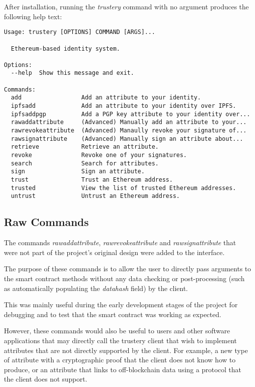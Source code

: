 \documentclass[12pt,a4paper]{report}
\begin{document}
	After installation, running the \textit{trustery} command with no argument produces the following help text:
	
	\begin{lstlisting}
Usage: trustery [OPTIONS] COMMAND [ARGS]...

  Ethereum-based identity system.

Options:
  --help  Show this message and exit.

Commands:
  add                 Add an attribute to your identity.
  ipfsadd             Add an attribute to your identity over IPFS.
  ipfsaddpgp          Add a PGP key attribute to your identity over...
  rawaddattribute     (Advanced) Manually add an attribute to your...
  rawrevokeattribute  (Advanced) Manaully revoke your signature of...
  rawsignattribute    (Advanced) Manually sign an attribute about...
  retrieve            Retrieve an attribute.
  revoke              Revoke one of your signatures.
  search              Search for attributes.
  sign                Sign an attribute.
  trust               Trust an Ethereum address.
  trusted             View the list of trusted Ethereum addresses.
  untrust             Untrust an Ethereum address.
	\end{lstlisting}
	
	\subsection{Raw Commands}
	The commands \textit{rawaddattribute}, \textit{rawrevokeattribute} and \textit{rawsignattribute} that were not part of the project's original design were added to the interface.
	
	The purpose of these commands is to allow the user to directly pass arguments to the smart contract methods without any data checking or post-processing (such as automatically populating the \textit{datahash} field) by the client.
	
	This was mainly useful during the early development stages of the project for debugging and to test that the smart contract was working as expected.
	
	However, these commands would also be useful to users and other software applications that may directly call the trustery client that wish to implement attributes that are not directly supported by the client. For example, a new type of attribute with a cryptographic proof that the client does not know how to produce, or an attribute that links to off-blockchain data using a protocol that the client does not support.
	
\end{document}
